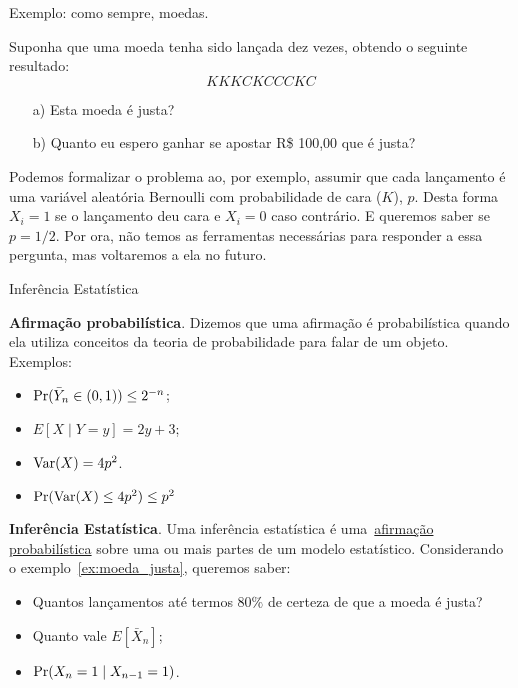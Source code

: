 \begin{frame}{Exemplo: como sempre, moedas.}
 \begin{pergunta}
 \label{ex:moeda_justa}
  Suponha que uma moeda tenha sido lançada dez vezes, obtendo o seguinte resultado:
  \begin{equation*}
   KKKCKCCCKC
  \end{equation*}
\begin{itemize}
 \item[a)] Esta moeda é justa?
 \item[b)] Quanto eu espero ganhar se apostar R\$ 100,00 que é justa? 
\end{itemize}
 \end{pergunta}
 Podemos formalizar o problema ao, por exemplo, assumir que cada lançamento é uma variável aleatória Bernoulli com probabilidade de cara ($K$), $p$.
 Desta forma $X_i = 1$ se o lançamento deu cara e $X_i = 0$ caso contrário.
 E queremos saber se $p = 1/2$.
 Por ora, não temos as ferramentas necessárias para responder a essa pergunta, mas voltaremos a ela no futuro.
\end{frame}
\begin{frame}{Inferência Estatística}
\begin{defn}
 \textbf{Afirmação probabilística}.
 Dizemos que uma afirmação é probabilística quando ela utiliza conceitos da teoria de probabilidade para falar de um objeto.
 Exemplos: 
 \begin{itemize}
  \item $\operatorname{Pr}( \bar{Y}_n \in (0, 1)) \leq 2^{-n}$;
  \item $E[X \mid Y = y] = 2y + 3$;
  \item $\operatorname{Var}(X) = 4p^2$.
  \item $\operatorname{Pr}(\operatorname{Var}(X) \leq 4p^2 ) \leq p^2$
 \end{itemize}
\end{defn}
\begin{defn}
 \textbf{Inferência Estatística}.
 Uma inferência estatística é uma~\underline{afirmação probabilística} sobre uma ou mais partes de um modelo estatístico.
 Considerando o exemplo~\ref{ex:moeda_justa}, queremos saber:
 \begin{itemize}
  \item Quantos lançamentos até termos $80\%$ de certeza de que a moeda é justa?
  \item Quanto vale $E[\bar{X}_n]$;
  \item $\operatorname{Pr}(X_{n} = 1 \mid X_{n-1} = 1)$. 
 \end{itemize}
\end{defn}
\end{frame}
